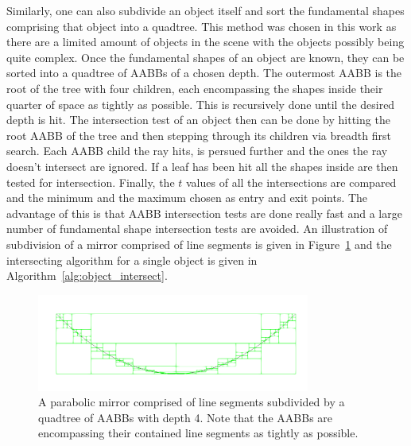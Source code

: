 \documentclass[a4paper,10pt]{article}
\newcommand{\figref}[1]{Figure~\ref{#1}}
\newcommand{\algref}[1]{Algorithm~\ref{#1}}
\begin{document}
    Similarly, one can also subdivide an object itself and sort the
    fundamental shapes comprising that object into a quadtree.
    This method was chosen in this work as there are a limited amount of
    objects in the scene with the objects possibly being quite complex.
    Once the fundamental shapes of an object are known, they can be
    sorted into a quadtree of AABBs of a chosen depth.
    The outermost AABB is the root of the tree with four children,
    each encompassing the shapes inside their quarter of space
    as tightly as possible.
    This is recursively done until the desired depth is hit.
    The intersection test of an object then can be done by hitting
    the root AABB of the tree and then stepping through its children
    via breadth first search.
    Each AABB child the ray hits, is persued further and the ones
    the ray doesn't intersect are ignored.
    If a leaf has been hit all the shapes inside are then tested for
    intersection.
    Finally, the $t$ values of all the intersections are compared and
    the minimum and the maximum chosen as entry and exit points. 
    The advantage of this is that AABB intersection tests are done really
    fast and a large number of fundamental shape intersection tests
    are avoided.
    An illustration of subdivision of a mirror comprised of line segments
    is given in \figref{fig:quadtree} and the intersecting algorithm
    for a single object is given in \algref{alg:object_intersect}.

    \begin{center}
        \begin{figure}
            \centering    
            \includegraphics[width=0.8\textwidth]{images/mirror.png}
            \caption[Subdivision using quadtrees]{
                A parabolic mirror comprised of line segments
                subdivided by a quadtree of AABBs with depth 4.
                Note that the AABBs are encompassing their contained line
                segments as tightly as possible.
            }
            \label{fig:quadtree}
        \end{figure}
    \end{center}
\end{document}
